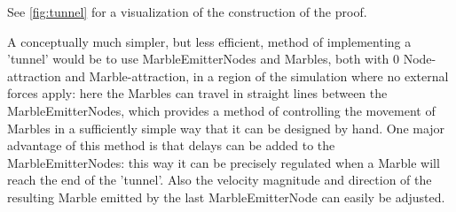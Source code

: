 See \ref{fig:tunnel} for a visualization of the construction of the proof. 

A conceptually much simpler, but less efficient, method of implementing a 'tunnel' would be to use MarbleEmitterNodes and Marbles, both with 0 Node-attraction and Marble-attraction, in a region of the simulation where no external forces apply: here the Marbles can travel in straight lines between the MarbleEmitterNodes, which provides a method of controlling the movement of Marbles in a sufficiently simple way that it can be designed by hand. One major advantage of this method is that delays can be added to the MarbleEmitterNodes: this way it can be precisely regulated when a Marble will reach the end of the 'tunnel'. Also the velocity magnitude and direction of the resulting Marble emitted by the last MarbleEmitterNode can easily be adjusted.

